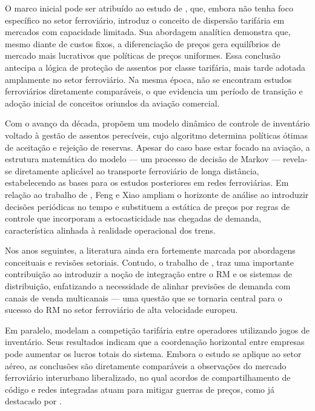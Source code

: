 O marco inicial pode ser atribuído ao estudo de \citet{Dana1999}, que, embora não tenha foco específico no setor ferroviário, introduz o conceito de dispersão tarifária em mercados com capacidade limitada. Sua abordagem analítica demonstra que, mesmo diante de custos fixos, a diferenciação de preços gera equilíbrios de mercado mais lucrativos que políticas de preços uniformes. Essa conclusão antecipa a lógica de proteção de assentos por classe tarifária, mais tarde adotada amplamente no setor ferroviário. Na mesma época, não se encontram estudos ferroviários diretamente comparáveis, o que evidencia um período de transição e adoção inicial de conceitos oriundos da aviação comercial.

Com o avanço da década, \citet{Feng2001} propõem um modelo dinâmico de controle de inventário voltado à gestão de assentos perecíveis, cujo algoritmo determina políticas ótimas de aceitação e rejeição de reservas. Apesar do caso base estar focado na aviação, a estrutura matemática do modelo — um processo de decisão de Markov — revela-se diretamente aplicável ao transporte ferroviário de longa distância, estabelecendo as bases para os estudos posteriores em redes ferroviárias. Em relação ao trabalho de \citet{Dana1999}, Feng e Xiao ampliam o horizonte de análise ao introduzir decisões periódicas no tempo e substituem a estática de preços por regras de controle que incorporam a estocasticidade nas chegadas de demanda, característica alinhada à realidade operacional dos trens.

Nos anos seguintes, a literatura ainda era fortemente marcada por abordagens conceituais e revisões setoriais. Contudo, o trabalho de \citet{Vinod2004}, traz uma importante contribuição ao introduzir a noção de integração entre o RM e os sistemas de distribuição, enfatizando a necessidade de alinhar previsões de demanda com canais de venda multicanais — uma questão que se tornaria central para o sucesso do RM no setor ferroviário de alta velocidade europeu.

Em paralelo, \citet{Netessine2005} modelam a competição tarifária entre operadores utilizando jogos de inventário. Seus resultados indicam que a coordenação horizontal entre empresas pode aumentar os lucros totais do sistema. Embora o estudo se aplique ao setor aéreo, as conclusões são diretamente comparáveis a observações do mercado ferroviário interurbano liberalizado, no qual acordos de compartilhamento de código e redes integradas atuam para mitigar guerras de preços, como já destacado por \citet{Ammirato2020}.

